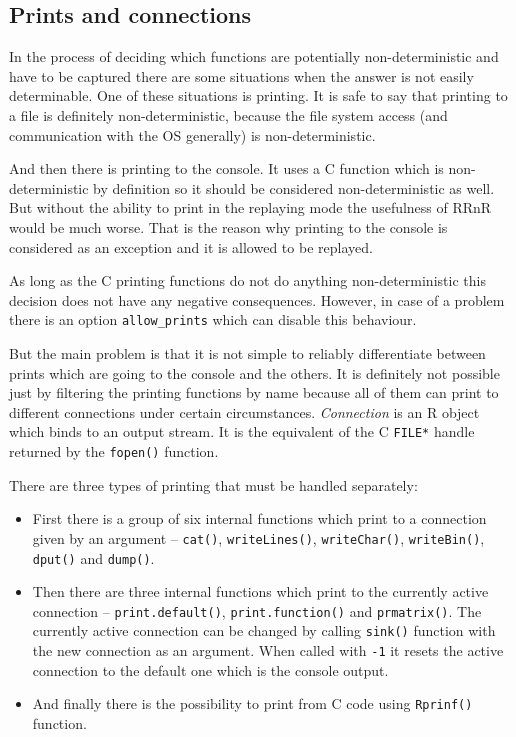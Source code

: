 \documentclass[thesis=M,english,hidelinks]{FITthesis}[2012/10/20]
\begin{document}
		\subsection{Prints and connections}
		In the process of deciding which functions are potentially non-deterministic and have to be captured there are some situations when the answer is not easily determinable. One of these situations is printing. It is safe to say that printing to a file is definitely non-deterministic, because the file system access (and communication with the OS generally) is non-deterministic.\par
		
		And then there is printing to the console. It uses a C function which is non-deterministic by definition so it should be considered non-deterministic as well. But without the ability to print in the replaying mode the usefulness of RRnR would be much worse. That is the reason why printing to the console is considered as an exception and it is allowed to be replayed.\par
		
		As long as the C printing functions do not do anything non-deterministic this decision does not have any negative consequences. However, in case of a problem there is an option \lstinline|allow_prints| which can disable this behaviour.\par
		
		But the main problem is that it is not simple to reliably differentiate between prints which are going to the console and the others. It is definitely not possible just by filtering the printing functions by name because all of them can print to different connections under certain circumstances. \emph{Connection} is an R object which binds to an output stream. It is the equivalent of the C \lstinline|FILE*| handle returned by the \lstinline|fopen()| function.\par
		
		\vspace{\topsep}
		\noindent
		There are three types of printing that must be handled separately:
		\vspace{-\topsep}
		\begin{itemize}
			\item First there is a group of six internal functions which print to a connection given by an argument -- \lstinline|cat()|, \lstinline|writeLines()|, \lstinline|writeChar()|, \lstinline|writeBin()|, \lstinline|dput()| and \lstinline|dump()|.
		
			\item Then there are three internal functions which print to the currently active connection -- \lstinline|print.default()|, \lstinline|print.function()| and \lstinline|prmatrix()|. The currently active connection can be changed by calling \lstinline|sink()| function with the new connection as an argument. When called with \lstinline|-1| it resets the active connection to the default one which is the console output.
		
			\item And finally there is the possibility to print from C code using \lstinline|Rprinf()| function.
		\end{itemize}
		
\end{document}
